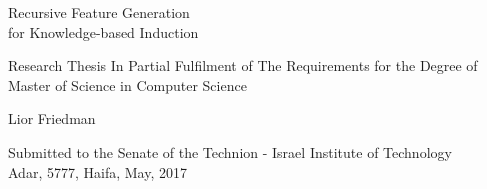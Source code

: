 \documentclass[twoside,11pt]{article}
\theoremstyle{definition}
\begin{document}
	

\thispagestyle{empty}

\begin{center}
{\LARGE Recursive Feature Generation\\ for Knowledge-based Induction}\\[0.2\baselineskip]
\end{center}

\begin{center}
{\large Research Thesis
In Partial Fulfilment of The Requirements for the Degree of
 \\Master of Science in Computer Science}
\end{center}

\vspace*{2\baselineskip}

\begin{center}
{\Large Lior Friedman}
\end{center}

\vspace*{8\baselineskip}


\begin{center}
Submitted to the Senate of the Technion - Israel Institute of Technology\\
Adar, 5777, Haifa, May, 2017
\end{center}

\clearpage
\thispagestyle{empty}

\tableofcontents

\clearpage
\thispagestyle{empty}

\listoffigures

\thispagestyle{empty}

\listoftables
\clearpage

\thispagestyle{empty}
\end{document}
